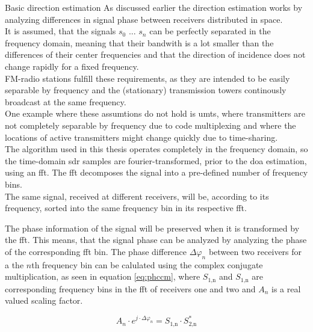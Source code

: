\begin{subchapter}{Basic direction estimation}
  As discussed earlier the direction estimation works by
  analyzing differences in signal phase between receivers
  distributed in space. \\

  It is assumed, that the signals $s_0$ ... $s_n$
  can be perfectly separated in the frequency domain,
  meaning that their bandwith is a lot smaller than
  the differences of their center frequencies
  and that the direction of incidence does not
  change rapidly for a fixed frequency. \\

  FM-radio stations fulfill these requirements,
  as they are intended to be easily separable by
  frequency and the (stationary) transmission towers continously
  broadcast at the same frequency. \\

  One example where these assumtions do not hold is
  \acrshort{umts}, where transmitters are not completely
  separable by frequency due to code multiplexing and
  where the locations of active transmitters
  might change quickly due to time-sharing. \\

  The algorithm used in this thesis operates completely
  in the frequency domain, so the time-domain \gls{sdr}
  samples are fourier-transformed, prior to the \gls{doa}
  estimation, using an \gls{fft}.
  The \gls{fft} decomposes the signal into a pre-defined
  number of frequency bins. \\

  The same signal, received at different receivers, will
  be, according to its frequency, sorted into the same
  frequency bin in its respective \gls{fft}.

  The phase information of the signal will be preserved
  when it is transformed by the \gls{fft}.
  This means, that the signal phase can be analyzed by
  analyzing the phase of the corresponding \gls{fft}
  bin.
  The phase difference $\Delta \varphi_{n}$ between two
  receivers for a the $n$th frequency bin can be calulated
  using the complex conjugate
  multiplication, as seen in equation \ref{eq:phccm},
  where $S_\text{1,n}$ and $S_\text{1,n}$ are corresponding
  frequency bins in the \gls{fft} of receivers one and two
  and $A_{n}$ is a real valued scaling factor.

  \begin{equation}
    \label{eq:phccm}
    A_{n} \cdot e^{j \cdot \Delta \varphi_{n}}
    = S_\text{1,n} \cdot S_\text{2,n}^\ast
  \end{equation}


\end{subchapter}
